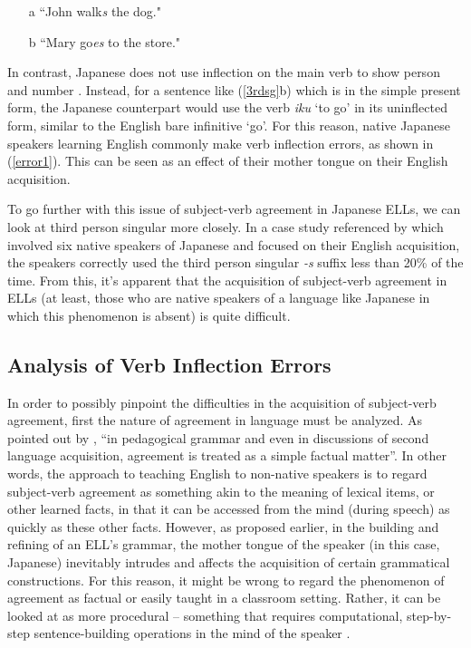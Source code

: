 \documentclass{article}
\begin{document}
\begin{exe}
	\ex
    \label{3rdsg}
    	\begin{itemize}
    		\item[a] “John walk\textit{s} the dog."
            \item[b] “Mary go\textit{es} to the store."
    	\end{itemize}
\end{exe}
In contrast, Japanese does not use inflection on the main verb to show person and number \citep{Bryant1984}. Instead, for a sentence like (\ref{3rdsg}b) which is in the simple present form, the Japanese counterpart would use the verb \textit{iku} ‘to go’ in its uninflected form, similar to the English bare infinitive ‘go’.  For this reason, native Japanese speakers learning English commonly make verb inflection errors, as shown in (\ref{error1}). This can be seen as an effect of their mother tongue on their English acquisition.
\begin{exe}
	\label{error1}
\end{exe}
To go further with this issue of subject-verb agreement in Japanese ELLs, we can look at third person singular more closely. In a case study referenced by \cite{O'Grady2006} which involved six native speakers of Japanese and focused on their English acquisition, the speakers correctly used the third person singular \textit{-s} suffix less than 20\% of the time. From this, it’s apparent that the acquisition of subject-verb agreement in ELLs (at least, those who are native speakers of a language like Japanese in which this phenomenon is absent) is quite difficult.

\subsection{Analysis of Verb Inflection Errors}

In order to possibly pinpoint the difficulties in the acquisition of subject-verb agreement, first the nature of agreement in language must be analyzed. As pointed out by \cite{O'Grady2006}, “in pedagogical grammar and even in discussions of second language acquisition, agreement is treated as a simple factual matter”. In other words, the approach to teaching English to non-native speakers is to regard subject-verb agreement as something akin to the meaning of lexical items, or other learned facts, in that it can be accessed from the mind (during speech) as quickly as these other facts. However, as proposed earlier, in the building and refining of an ELL's grammar, the mother tongue of the speaker (in this case, Japanese) inevitably intrudes and affects the acquisition of certain grammatical constructions. For this reason, it might be wrong to regard the phenomenon of agreement as factual or easily taught in a classroom setting. Rather, it can be looked at as more procedural – something that requires computational, step-by-step sentence-building operations in the mind of the speaker \citep{O'Grady2006}.\\
	
\end{document}
